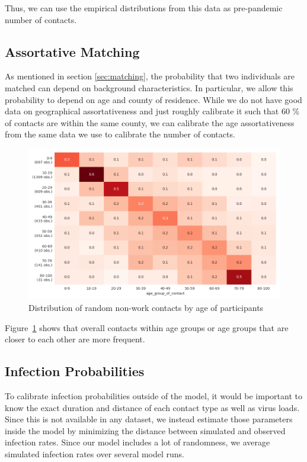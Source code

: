 Thus, we can use the empirical distributions from this data as pre-pandemic number of contacts.


\subsection{Assortative Matching}

As mentioned in section \ref{sec:matching}, the probability that two individuals are matched can depend on background characteristics. In particular, we allow this probability to depend on age and county of residence. While we do not have good data on geographical assortativeness and just roughly calibrate it such that 60 \% of contacts are within the same county\footnotemark, we can calibrate the age assortativeness from the same data we use to calibrate the number of contacts.


\begin{figure}[!tp]
    \centering
    \includegraphics[width=\textwidth]{../figures/assortative_matching_probability_example.png}
    \caption{Distribution of random non-work contacts by age of participants}
    \label{fig:assortativeness}
\end{figure}

Figure~\ref{fig:assortativeness} shows that overall contacts within age groups or age groups that are closer to each other are more frequent.


\subsection{Infection Probabilities}
\label{sec:estimation}

To calibrate infection probabilities outside of the model, it would be important to know the exact duration and distance of each contact type as well as virus loads. Since this is not available in any dataset, we instead estimate those parameters inside the model by minimizing the distance between simulated and observed infection rates. Since our model includes a lot of randomness, we average simulated infection rates over several model runs.

